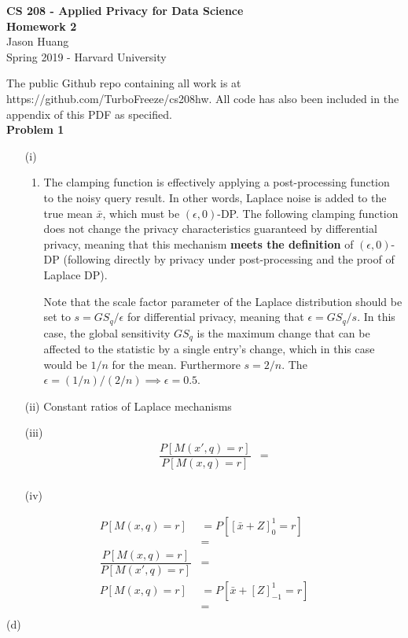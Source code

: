 \documentclass[12pt]{article}
\begin{document}
\begin{center}
	{\Large \textbf{CS 208 - Applied Privacy for Data Science}}\\
	{\Large \textbf{Homework 2}}\\
	\vspace*{0.1in}
	Jason Huang\\
	Spring 2019 - Harvard University\\
\end{center}

The public Github repo containing all work is at https://github.com/TurboFreeze/cs208hw. All code has also been included in the appendix of this PDF as specified.\\

{\large\textbf{Problem 1}}

\begin{enumerate}
	\item[(i)] \begin{enumerate}
	\item The clamping function is effectively applying a post-processing function to the noisy query result. In other words, Laplace noise is added to the true mean $\bar{x}$, which must be $(\epsilon, 0)$-DP. The following clamping function does not change the privacy characteristics guaranteed by differential privacy, meaning that this mechanism \textbf{meets the definition} of $(\epsilon, 0)$-DP (following directly by privacy under post-processing and the proof of Laplace DP).
	
	Note that the scale factor parameter of the Laplace distribution should be set to $s = GS_q/\epsilon$ for differential privacy, meaning that $\epsilon = GS_q/s$. In this case, the global sensitivity $GS_q$ is the maximum change that can be affected to the statistic by a single entry's change, which in this case would be $1/n$ for the mean. Furthermore $s = 2 / n$. The $\epsilon = (1/n) / (2/n) \implies \boxed{\epsilon= 0.5}$.
	\end{enumerate}
	\item[(ii)] Constant ratios of Laplace mechanisms
	\item[(iii)] 
	\begin{align*}
		\dfrac{P[M(x', q) = r]}{P[M(x, q)=r]} &= \\
	\end{align*}
	\item[(iv)] 
\end{enumerate}
\begin{align*}
	P[M(x, q) = r] &= P[[\bar{x} + Z]^1_0 = r]\\
	&= \\
	\dfrac{P[M(x, q) = r]}{P[M(x', q)=r]} &= \\
	P[M(x, q) = r] &= P[\bar{x} + [Z]^1_{-1} = r]\\
	&= \\
\end{align*}
(d)
\end{document}
